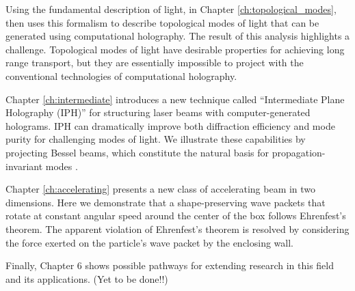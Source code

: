 Using the fundamental description of light, in Chapter \ref{ch:topological_modes}, then uses this formalism to  describe topological modes of light that can be generated using computational holography. The result of this analysis highlights a challenge. Topological modes of light have desirable properties for achieving long range transport, but they are essentially impossible to project with the conventional technologies of computational holography.

Chapter \ref{ch:intermediate} introduces a new technique called ``Intermediate Plane Holography (IPH)''  for structuring laser beams with computer-generated holograms. IPH can dramatically improve both diffraction efficiency and mode purity for challenging modes of light. We illustrate these capabilities by projecting Bessel beams, which constitute the natural basis for propagation-invariant modes \cite{durnin87,durnin87a}.

Chapter \ref{ch:accelerating} presents a new class of accelerating beam in two dimensions. Here we demonstrate that a shape-preserving wave packets that rotate at constant angular speed around the center of the box follows Ehrenfest's theorem. The apparent violation of Ehrenfest’s theorem is resolved by considering the force exerted on the particle’s wave packet by the enclosing wall.

Finally, Chapter 6 shows possible pathways for extending research in this field and its applications. (Yet to be done!!)
